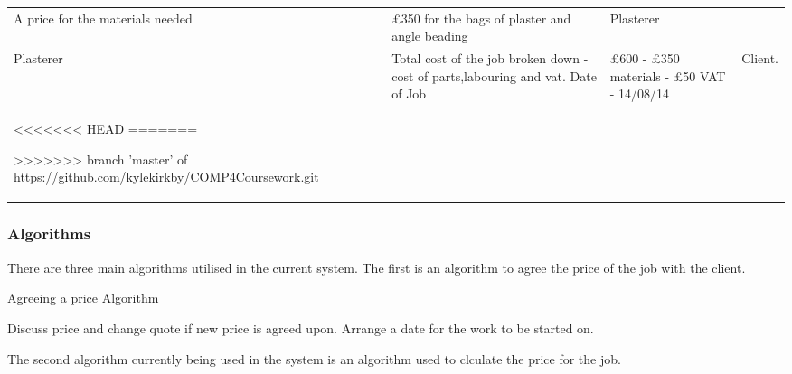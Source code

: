 \begin{center}
\begin{tabular}{|p{4cm}|p{8.5cm}|}
A price for the materials needed &

\pounds 350 for the bags of plaster and angle beading &

Plasterer


\\

Plasterer &

Total cost of the job broken down - cost of parts,labouring and vat. Date of Job &

\pounds 600 - \pounds 350 materials - \pounds 50 VAT - 14/08/14 &

Client.

\\
<<<<<<< HEAD
=======

>>>>>>> branch 'master' of https://github.com/kylekirkby/COMP4Coursework.git
        \hline
    \end{tabular}
\end{center}


\subsubsection{Algorithms}

There are three main algorithms utilised in the current system. The first is an algorithm to agree the price of the job with the client.

\begin{algorithm}[H]
\label{fig:algorithm_example_1}
	\caption{Agreeing a price Algorithm}
\begin{algorithmic}[1]

	
			Discuss price and change quote if new price is agreed upon.\;
		\Else 
			Arrange a date for the work to be started on.\;
		\EndIf
	\EndWhile

\end{algorithmic}
\end{algorithm}


The second algorithm currently being used in the system is an algorithm used to clculate the price for the job.


